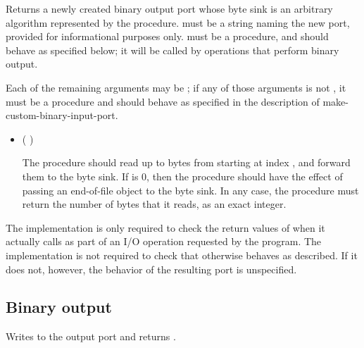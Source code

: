 \begin{entry}{%
}

Returns a newly created binary output port whose byte sink is
an arbitrary algorithm represented by the  procedure.
 must be a string naming the new port,
provided for informational purposes only.
 must be a procedure, and should behave as specified
below; it will be called by operations that perform binary output.

Each of the remaining arguments may be \schfalse{}; if any of
those arguments is not \schfalse{}, it must be a procedure and
should behave as specified in the description of
{\cf make-custom-binary-input-port}.
   
\begin{itemize}
\item {\cf (   )}
       
  The  procedure should read up to  bytes
  from  starting at index , and forward
  them to the byte sink.
  If  is 0, then the  procedure should
  have the effect of passing an end-of-file object to the byte sink.
  In any case, the  procedure must return the number of
  bytes that it reads, as an exact integer.
\end{itemize}

\implresp The implementation is only required to check the return
values of  when it actually calls  as part of
an I/O operation requested by the program.  The implementation is not
required to check that  otherwise behaves as described.
If it does not, however, the behavior of the resulting port is
unspecified.
\end{entry}

\subsection{Binary output}

\begin{entry}{%
}

Writes  to the output port and returns \unspecifiedreturn.
\end{entry}

